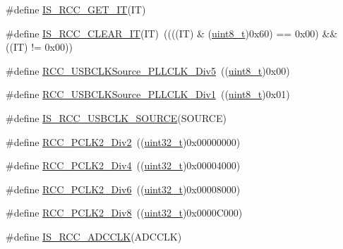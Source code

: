 \begin{DoxyCompactItemize}
\item 
\#define \hyperlink{group___r_c_c___interrupt__source_ga7a1b771d6d9c2d8346ab58a1f046f6a6}{I\+S\+\_\+\+R\+C\+C\+\_\+\+G\+E\+T\+\_\+\+IT}(IT)
\item 
\#define \hyperlink{group___r_c_c___interrupt__source_ga8374741e47d696accd1a72647650ba63}{I\+S\+\_\+\+R\+C\+C\+\_\+\+C\+L\+E\+A\+R\+\_\+\+IT}(IT)~((((IT) \& (\hyperlink{_p_e___types_8h_aba7bc1797add20fe3efdf37ced1182c5}{uint8\+\_\+t})0x60) == 0x00) \&\& ((\+I\+T) != 0x00))
\item 
\#define \hyperlink{group___u_s_b___device__clock__source_ga5e7a39e25fc37fd2b90edfe66bf1f53f}{R\+C\+C\+\_\+\+U\+S\+B\+C\+L\+K\+Source\+\_\+\+P\+L\+L\+C\+L\+K\+\_\+Div5}~((\hyperlink{_p_e___types_8h_aba7bc1797add20fe3efdf37ced1182c5}{uint8\+\_\+t})0x00)
\item 
\#define \hyperlink{group___u_s_b___device__clock__source_ga8162727793b5690d6b96ad0cc7ce3866}{R\+C\+C\+\_\+\+U\+S\+B\+C\+L\+K\+Source\+\_\+\+P\+L\+L\+C\+L\+K\+\_\+\+Div1}~((\hyperlink{_p_e___types_8h_aba7bc1797add20fe3efdf37ced1182c5}{uint8\+\_\+t})0x01)
\item 
\#define \hyperlink{group___u_s_b___device__clock__source_ga484f7834b5506d9879ed84660c894250}{I\+S\+\_\+\+R\+C\+C\+\_\+\+U\+S\+B\+C\+L\+K\+\_\+\+S\+O\+U\+R\+CE}(S\+O\+U\+R\+CE)
\item 
\#define \hyperlink{group___a_d_c__clock__source_ga6c341971f2f161320ad150faa3636b41}{R\+C\+C\+\_\+\+P\+C\+L\+K2\+\_\+\+Div2}~((\hyperlink{_p_e___types_8h_a33594304e786b158f3fb30289278f5af}{uint32\+\_\+t})0x00000000)
\item 
\#define \hyperlink{group___a_d_c__clock__source_gaecc7a9370fb7d7772d9c90888792084c}{R\+C\+C\+\_\+\+P\+C\+L\+K2\+\_\+\+Div4}~((\hyperlink{_p_e___types_8h_a33594304e786b158f3fb30289278f5af}{uint32\+\_\+t})0x00004000)
\item 
\#define \hyperlink{group___a_d_c__clock__source_gaffb34a845f94f4ea741a45998d28deb3}{R\+C\+C\+\_\+\+P\+C\+L\+K2\+\_\+\+Div6}~((\hyperlink{_p_e___types_8h_a33594304e786b158f3fb30289278f5af}{uint32\+\_\+t})0x00008000)
\item 
\#define \hyperlink{group___a_d_c__clock__source_ga77d5c803e2d31a806467bb7db9d24cd0}{R\+C\+C\+\_\+\+P\+C\+L\+K2\+\_\+\+Div8}~((\hyperlink{_p_e___types_8h_a33594304e786b158f3fb30289278f5af}{uint32\+\_\+t})0x0000\+C000)
\item 
\#define \hyperlink{group___a_d_c__clock__source_ga6a9c4fb239566f0f3d44c8cc266e528b}{I\+S\+\_\+\+R\+C\+C\+\_\+\+A\+D\+C\+C\+LK}(A\+D\+C\+C\+LK)
\item 

\end{DoxyCompactItemize}
